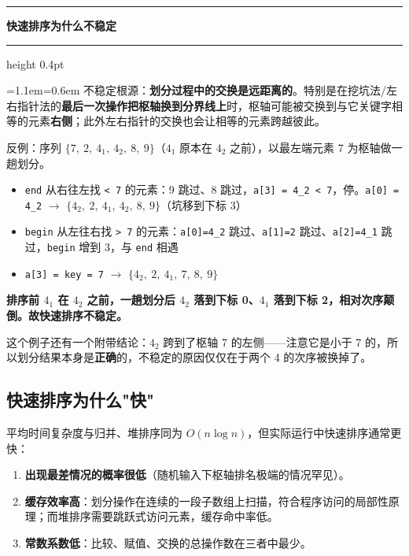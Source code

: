 \documentclass[11pt,openany,UTF8]{ctexbook}
\newcommand{\callouthead}[2]{%
  \par\addvspace{7pt}\noindent
  {\color{#1}\rule[-0.15em]{3pt}{1.05em}}\hspace{0.5em}%
  {\bfseries\color{#1}#2}\par\nobreak\vspace{-0.35em}%
  {\color{rulesep}\hrule height 0.4pt}\nobreak\vspace{0.45em}%
  \begingroup\small\setlength{\parindent}{0pt}%
  \leftskip=1.1em\rightskip=0.6em\noindent\ignorespaces}
\newcommand{\calloutend}{\par\endgroup\addvspace{7pt}}
\newenvironment{callkey}[1]{\callouthead{keybar}{#1}}{\calloutend}
\begin{document}
\begin{callkey}{快速排序为什么不稳定}
不稳定根源：\textbf{划分过程中的交换是远距离的}。特别是在挖坑法/左右指针法的\textbf{最后一次操作把枢轴换到分界线上}时，枢轴可能被交换到与它关键字相等的元素\textbf{右侧}；此外左右指针的交换也会让相等的元素跨越彼此。

\end{callkey}

反例：序列 $\{7,\ 2,\ 4_1,\ 4_2,\ 8,\ 9\}$（$4_1$ 原本在 $4_2$ 之前），以最左端元素 7 为枢轴做一趟划分。

\begin{itemize}
\item \texttt{end} 从右往左找 \texttt{<\allowbreak{} 7} 的元素：9 跳过、8 跳过，\texttt{a[3]\allowbreak{} =\allowbreak{} 4\_2 <\allowbreak{} 7}，停。\texttt{a[0]\allowbreak{} =\allowbreak{} 4\_2} $\to$ $\{4_2,\ 2,\ 4_1,\ 4_2,\ 8,\ 9\}$（坑移到下标 3）
\item \texttt{begin} 从左往右找 \texttt{>\allowbreak{} 7} 的元素：\texttt{a[0]\allowbreak{}=\allowbreak{}4\_2} 跳过、\texttt{a[1]\allowbreak{}=\allowbreak{}2} 跳过、\texttt{a[2]\allowbreak{}=\allowbreak{}4\_1} 跳过，\texttt{begin} 增到 3，与 \texttt{end} 相遇
\item \texttt{a[3]\allowbreak{} =\allowbreak{} key =\allowbreak{} 7} $\to$ $\{4_2,\ 2,\ 4_1,\ 7,\ 8,\ 9\}$
\end{itemize}
\textbf{排序前 $4_1$ 在 $4_2$ 之前，一趟划分后 $4_2$ 落到下标 0、$4_1$ 落到下标 2，相对次序颠倒。故快速排序不稳定。}

这个例子还有一个附带结论：$4_2$ 跨到了枢轴 7 的左侧——注意它是小于 7 的，所以划分结果本身是\textbf{正确}的，不稳定的原因仅仅在于两个 4 的次序被换掉了。

\subsection{快速排序为什么"快"}

平均时间复杂度与归并、堆排序同为 $O(n\log n)$，但实际运行中快速排序通常更快：

\begin{enumerate}
\item \textbf{出现最差情况的概率很低}（随机输入下枢轴排名极端的情况罕见）。
\item \textbf{缓存效率高}：划分操作在连续的一段子数组上扫描，符合程序访问的局部性原理；而堆排序需要跳跃式访问元素，缓存命中率低。
\item \textbf{常数系数低}：比较、赋值、交换的总操作数在三者中最少。
\end{enumerate}
\end{document}
